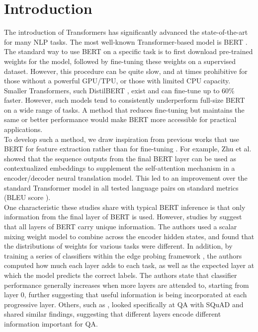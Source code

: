 \section{Introduction}



The introduction of Transformers \cite{Vaswani2017} has significantly advanced the state-of-the-art for many NLP tasks. The most well-known Transformer-based model is BERT \cite{Devlin2019}. The standard way to use BERT on a specific task is to first download pre-trained weights for the model, followed by fine-tuning these weights on a supervised dataset. However, this procedure can be quite slow, and at times prohibitive for those without a powerful GPU/TPU, or those with limited CPU capacity. Smaller Transformers, such DistilBERT \cite{sanh2019distilbert}, exist and can fine-tune up to 60\% faster. However, such models tend to consistently underperform full-size BERT on a wide range of tasks. A method that reduces fine-tuning but maintains the same or better performance would make BERT more accessible for practical applications. \\

To develop such a method, we draw inspiration from previous works that use BERT for feature extraction rather than for fine-tuning \citep{Zhu2020IncorporatingBI, Chen_2020}. For example, Zhu et al. showed that the sequence outputs from the final BERT layer can be used as contextualized embeddings to supplement the self-attention mechanism in a encoder/decoder neural translation model. This led to an improvement over the standard Transformer model in all tested language pairs on standard metrics (BLEU score \cite{Papineni02bleu:a}). \\

One characteristic these studies share with typical BERT inference is that only information from the final layer of BERT is used. However, studies by \cite{Tenney2020} suggest that all layers of BERT carry unique information. The authors used a scalar mixing weight model to combine across the encoder hidden states, and found that the distributions of weights for various tasks were different. In addition, by training a series of classifiers within the edge probing framework \cite{DBLP:journals/corr/abs-1905-06316}, the authors computed how much each layer adds to each task, as well as the expected layer at which the model predicts the correct labels. The authors state that classifier performance generally increases when more layers are attended to, starting from layer 0, further suggesting that useful information is being incorporated at each progressive layer. Others, such as \cite{Aken2020}, looked specifically at QA with SQuAD and shared similar findings, suggesting that different layers encode different information important for QA. \\

